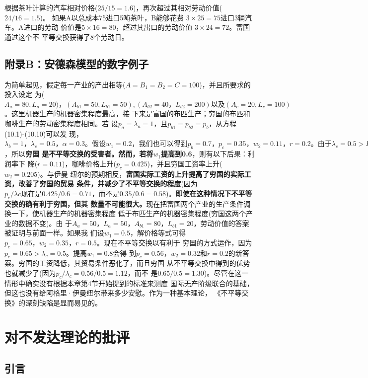 根据茶叶计算的汽车相对价格($25 / 15=1.6$)，再次超过其相对劳动价值($24 / 16=1.5$)。
如果A以总成本75进口5吨茶叶，B能够花费 $ 3 \times 25 = 75$进口3辆汽车。A进口的劳动
价值是$5 \times 16 = 80$，超过其出口的劳动价值 $3 \times 24 = 72$。富国通过这个不
平等交换获得了8个劳动日。

\section{附录B：安德森模型的数字例子}
为简单起见，假定每一产业的产出相等($A=B_1=B_2=C= 100$)，并且所要求的投入设定
为($A_a=80, L_a=20)，(A_{b1}= 50, L_{b1}=50),
(A_{b2}=40，L_{b2}=200)以及(A_c=20, L_c=100)$。这里机器生产的机器密集程度最高，接
下来是富国的布匹生产；穷国的布匹和咖啡生产的劳动密集程度相同。若
设$p_a=\lambda_a=1，且p_{b1}=p_{b2}=p_{b}$，从方程(10.1)-(10.10)可以发
现，$\lambda_b=1，\lambda_c=0.5，\alpha =0.3。假设w_1=0.2，我们也可以得到p_b
=0.7，p_c=0.35，w_2=0.11，r=0.2。由于\lambda_c=0.5 > P_c =0.35$，所以\textbf{穷国
  是不平等交换的受害者。然而，若将$w_1$提高到0.6}，则有以下后果：利润率下
降($r=0.11$)，咖啡价格上升($p_c=0.425$)，并且穷国工资率上升($w_2=0.205$)。与伊曼
纽尔的预期相反，\textbf{富国实际工资的上升提高了穷国的实际工资，改善了穷国的贸易
  条件，并减少了不平等交换的程度}(因为 $p_c / \lambda c 现在是0.425 / 0.6=0.71，
而不是0.35 / 0.6= 0.58$)。\textbf{即使在这种情况下不平等交换的确有利于穷国，但其
  数量不可能很大。}现在把富国两个产业的生产条件调换一下，使机器生产的机器密集程度
低于布匹生产的机器密集程度(穷国这两个产业的数据不变)。由
于$A_a=50，L_a=50，A_{b1}=80，L_{b1}=20$，劳动价值的答案被证明与前面一样。如果我
们设$w_1=0.5$，解价格等式可得$p_c=0.65，w_2=0.35，r=0.5$。现在不平等交换以有利于
穷国的方式运作，因为$p_c=0.65 > \lambda_c = 0.5$。提高$w_1=0.8$会得
到$p_c=0.56，w_2=0.32和r=0.2$的新答案。穷国的工资降低，其贸易条件恶化了，而且穷国
从不平等交换中得到的优势也就减少了(因为$p_c / \lambda _c = 0.56 / 0.5=1.12$，而不
是$0. 65 / 0.5=1.30$)。尽管在这一情形中确实没有根据本章第4节开始提到的标准来测度
国际无产阶级联合的基础，但这也没有给阿格里·伊曼纽尔带来多少安慰。作为一种基本理论，
《不平等交换》的深刻缺陷是显而易见的。



\chapter{对不发达理论的批评}

\section{引言}

